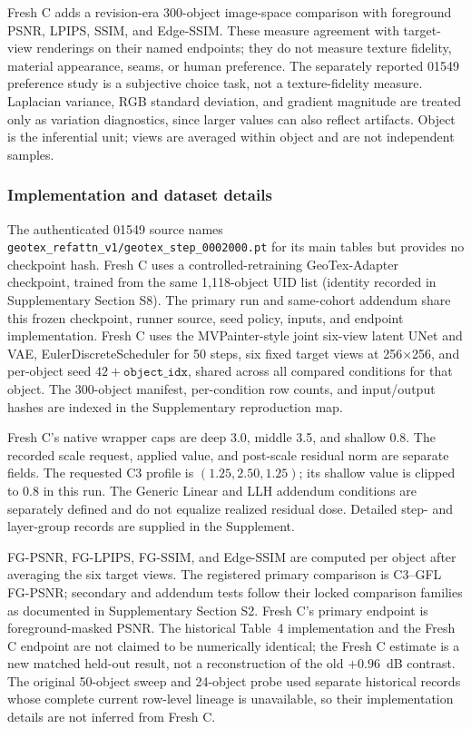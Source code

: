 \documentclass[times,twocolumn,final]{elsarticle}
\begin{document}
Fresh C adds a revision-era 300-object image-space comparison with foreground PSNR, LPIPS, SSIM, and Edge-SSIM. These measure agreement with target-view renderings on their named endpoints; they do not measure texture fidelity, material appearance, seams, or human preference. The separately reported 01549 preference study is a subjective choice task, not a texture-fidelity measure. Laplacian variance, RGB standard deviation, and gradient magnitude are treated only as variation diagnostics, since larger values can also reflect artifacts. Object is the inferential unit; views are averaged within object and are not independent samples.

\subsubsection{Implementation and dataset details}

The authenticated 01549 source names \texttt{geotex\_refattn\_v1/geotex\_step\_0002000.pt} for its main tables but provides no checkpoint hash. Fresh C uses a controlled-retraining GeoTex-Adapter checkpoint, trained from the same 1,118-object UID list (identity recorded in Supplementary Section S8). The primary run and same-cohort addendum share this frozen checkpoint, runner source, seed policy, inputs, and endpoint implementation. Fresh C uses the MVPainter-style joint six-view latent UNet and VAE, EulerDiscreteScheduler for 50 steps, six fixed target views at 256$\times$256, and per-object seed $42+\texttt{object\_idx}$, shared across all compared conditions for that object. The 300-object manifest, per-condition row counts, and input/output hashes are indexed in the Supplementary reproduction map.

Fresh C's native wrapper caps are deep 3.0, middle 3.5, and shallow 0.8. The recorded scale request, applied value, and post-scale residual norm are separate fields. The requested C3 profile is $(1.25,2.50,1.25)$; its shallow value is clipped to 0.8 in this run. The Generic Linear and LLH addendum conditions are separately defined and do not equalize realized residual dose. Detailed step- and layer-group records are supplied in the Supplement.

FG-PSNR, FG-LPIPS, FG-SSIM, and Edge-SSIM are computed per object after averaging the six target views. The registered primary comparison is C3--GFL FG-PSNR; secondary and addendum tests follow their locked comparison families as documented in Supplementary Section S2. Fresh C's primary endpoint is foreground-masked PSNR. The historical Table~4 implementation and the Fresh C endpoint are not claimed to be numerically identical; the Fresh C estimate is a new matched held-out result, not a reconstruction of the old $+0.96$~dB contrast. The original 50-object sweep and 24-object probe used separate historical records whose complete current row-level lineage is unavailable, so their implementation details are not inferred from Fresh C.
\end{document}
